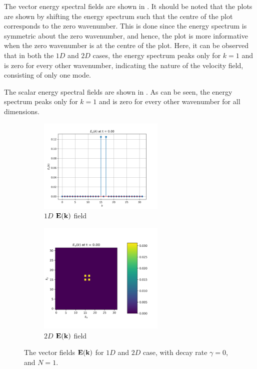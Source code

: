 The vector energy spectral fields are shown in . It should be noted that the plots are shown by shifting the energy spectrum such that the centre of the plot corresponds to the zero wavenumber. This is done since the energy spectrum is symmetric about the zero wavenumber, and hence, the plot is more informative when the zero wavenumber is at the centre of the plot. Here, it can be observed that in both the $1D$ and $2D$ cases, the energy spectrum peaks only for $k=1$ and is zero for every other wavenumber, indicating the nature of the velocity field, consisting of only one mode. 

The scalar energy spectral fields are shown in . As can be seen, the energy spectrum peaks only for $k=1$ and is zero for every other wavenumber for all dimensions.

\begin{figure}[htbp!]
    \begin{subfigure}{7cm}
      \centering\includegraphics[width=6cm]{Code-Figures/espec-simple-1d/EK_spectrum.png}
      \caption{$1D$ $\mathbf{E}(\mathbf{k})$ field}
    \end{subfigure}
    \begin{subfigure}{7cm}
      \centering\includegraphics[width=6cm]{Code-Figures/espec-simple-2d/EK_spectrum.png}
      \caption{$2D$ $\mathbf{E}(\mathbf{k})$ field}
    \end{subfigure}
    \caption{The vector fields $\mathbf{E}(\mathbf{k})$ for $1D$ and $2D$ case, with decay rate $\gamma=0$, and $N=1$.}
    \label{fig:espec-vector-fields-N1}
\end{figure}

